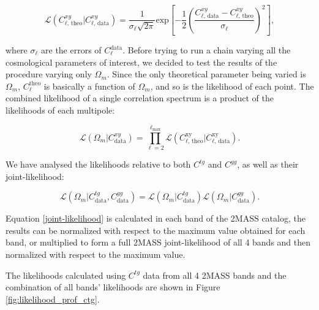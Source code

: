 \documentclass[openany,a4paper,12pt,oneside]{book}
\begin{document}
\begin{spacing}{1.5}
\begin{equation}\label{likelihood_cl}
	\mathcal{L}(C_{\ell\text{, theo}}^{xy}|C_{\ell\text{, data}}^{xy})=\frac{1}{\sigma_\ell \sqrt{2\pi}}\text{exp}\left[-\frac{1}{2}\left(\frac{C_{\ell\text{, data}}^{xy}-C_{\ell\text{, theo}}^{xy}}{\sigma_\ell}\right)^2\right],
\end{equation}

\noindent where $\sigma_\ell$ are the errors of $C_\ell^\text{data}$. Before trying to run a chain varying all the cosmological parameters of interest, we decided to test the results of the procedure varying only $\Omega_m$. Since the only theoretical parameter being varied is $\Omega_m$, $C_\ell^\text{theo}$ is basically a function of $\Omega_m$, and so is the likelihood of each point. The combined likelihood of a single correlation spectrum is a product of the likelihoods of each multipole:

\begin{equation}\label{likelihood_cxy}
	\mathcal{L}(\Omega_m|C^{xy}_\text{data})=\prod_{\ell=2}^{\ell_\text{max}} \mathcal{L}(C_{\ell\text{, theo}}^\text{xy}|C_{\ell\text{, data}}^\text{xy}).
\end{equation}

We have analysed the likelihoods relative to both $C^{tg}$ and $C^{gg}$, as well as their joint-likelihood:

\begin{equation}\label{joint-likelihood}
	\mathcal{L}(\Omega_m|C^{tg}_\text{data},C^{gg}_\text{data})=\mathcal{L}(\Omega_m|C^{tg}_\text{data})\mathcal{L}(\Omega_m|C^{gg}_\text{data}).
\end{equation}

Equation \eqref{joint-likelihood} is calculated in each band of the 2MASS catalog, the results can be normalized with respect to the maximum value obtained for each band, or multiplied to form a full 2MASS joint-likelihood of all 4 bands and then normalized with respect to the maximum value. 

The likelihoods calculated using $C^{tg}$ data from all 4 2MASS bands and the combination of all bands' likelihoods are shown in Figure \ref{fig:likelihood_prof_ctg}. 


\end{spacing}
\end{document}
